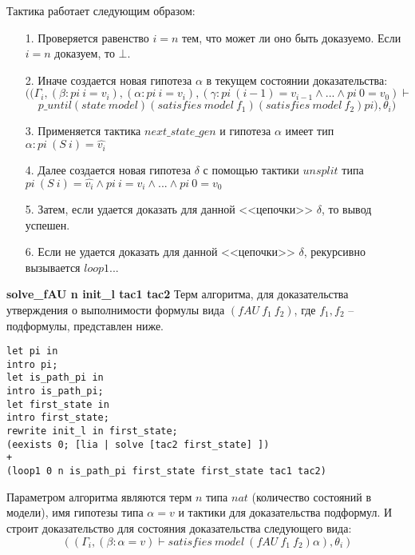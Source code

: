 \documentclass[12pt]{article}
\begin{document}
Тактика работает следующим образом:
\begin{enumerate}
    \item[1.] Проверяется равенство $i=n$ тем, что может ли оно быть доказуемо. Если $i=n$ доказуем, то $\bot$.
    \item[2.] Иначе создается новая гипотеза $\alpha$ в текущем состоянии доказательства:
    $$((\Gamma_i, (\beta: pi\ i = v_i),(\alpha: pi\ i = v_i),(\gamma: pi\ (i-1) = v_{i-1} \wedge ... \wedge pi\ 0 = v_0) \vdash $$
    $$p\_until (state\ model) (satisfies\ model\ f_1) (satisfies\ model\ f_2) pi), \theta_i)$$
    \item[3.] Применяется тактика $next\_state\_gen$ и гипотеза $\alpha$ имеет тип $\alpha:pi\ (S\ i) = \hat{v_i}$
    \item[4.] Далее создается новая гипотеза $\delta$  с помощью тактики $unsplit$ типа $pi\ (S\ i) = \hat{v_i} \wedge pi\ i = v_{i} \wedge ... \wedge pi\ 0 = v_0$
    \item[5.] Затем, если удается доказать для данной <<цепочки>> $\delta$, то вывод успешен.
    \item[6.] Если не удается доказать для данной <<цепочки>> $\delta$, рекурсивно вызывается $loop1...$
\end{enumerate}


\textbf{solve\_fAU n init\_l tac1 tac2}
Терм алгоритма, для доказательства утверждения о выполнимости формулы вида
$(fAU\ f_1\ f_2 )$, где $f_1,f_2$ – подформулы, представлен ниже.
\begin{verbatim}
let pi in
intro pi;
let is_path_pi in
intro is_path_pi;
let first_state in
intro first_state;
rewrite init_l in first_state;
(eexists 0; [lia | solve [tac2 first_state] ])
+
(loop1 0 n is_path_pi first_state first_state tac1 tac2)
\end{verbatim}

Параметром алгоритма являются терм $n$ типа $nat$ (количество состояний в модели), имя гипотезы типа $\alpha = v$ и тактики для доказательства подформул.
И строит доказательство для состояния доказательства следующего вида:
$$((\Gamma_i, (\beta:\alpha = v) \vdash satisfies\ model\ (fAU\ f_1\ f_2) \alpha), \theta_i)$$
\end{document}
